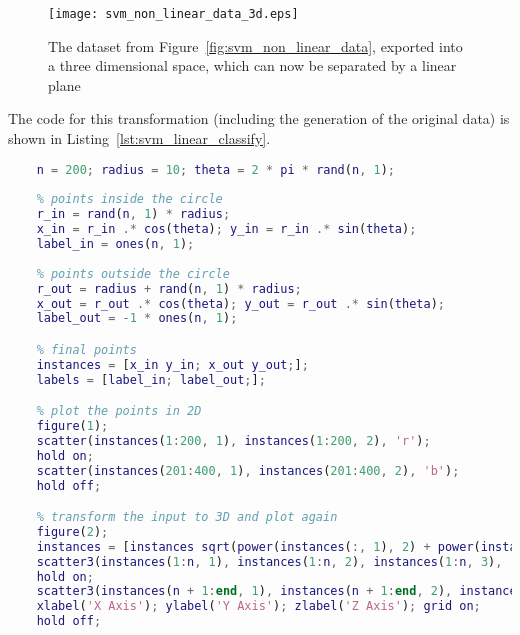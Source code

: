 \begin{figure}[t!]
    \centering
    \texttt{[image: svm\_non\_linear\_data\_3d.eps]}
    \caption{The dataset from Figure~\ref{fig:svm_non_linear_data}, exported into a three dimensional space, which can now be separated by a linear plane}
    \label{fig:svm_non_linear_data_3d}
\end{figure}

The code for this transformation (including the generation of the original data) is shown in Listing~\ref{lst:svm_linear_classify}.\\

\begin{lstlisting}[language=Matlab,frame=single,captionpos=b,caption={Generating the dataset to be classified by a linear classifier},breaklines=true,label={lst:svm_linear_classify}]
    % constants
    n = 200; radius = 10; theta = 2 * pi * rand(n, 1);
    
    % points inside the circle
    r_in = rand(n, 1) * radius;
    x_in = r_in .* cos(theta); y_in = r_in .* sin(theta);
    label_in = ones(n, 1);
    
    % points outside the circle
    r_out = radius + rand(n, 1) * radius;
    x_out = r_out .* cos(theta); y_out = r_out .* sin(theta);
    label_out = -1 * ones(n, 1);

    % final points
    instances = [x_in y_in; x_out y_out;];
    labels = [label_in; label_out;];

    % plot the points in 2D
    figure(1);
    scatter(instances(1:200, 1), instances(1:200, 2), 'r');
    hold on;
    scatter(instances(201:400, 1), instances(201:400, 2), 'b');
    hold off;

    % transform the input to 3D and plot again
    figure(2);
    instances = [instances sqrt(power(instances(:, 1), 2) + power(instances(:, 2), 2))];
    scatter3(instances(1:n, 1), instances(1:n, 2), instances(1:n, 3), 'r');
    hold on;
    scatter3(instances(n + 1:end, 1), instances(n + 1:end, 2), instances(n + 1:end, 3), 'b');
    xlabel('X Axis'); ylabel('Y Axis'); zlabel('Z Axis'); grid on;
    hold off;
\end{lstlisting}
